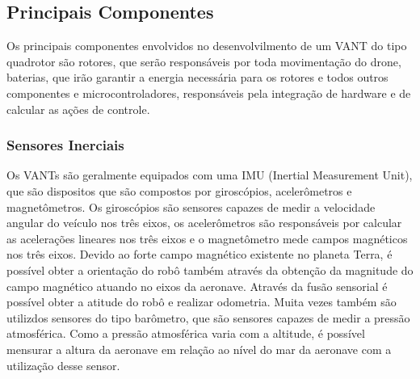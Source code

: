 
\subsection{Principais Componentes}

Os principais componentes envolvidos no desenvolvilmento de um VANT do tipo quadrotor são rotores, que serão responsáveis por toda movimentação do drone, baterias, que irão garantir a energia necessária para os rotores e todos outros componentes e microcontroladores, responsáveis pela integração de hardware e de calcular as ações de controle.

\subsubsection{Sensores Inerciais}

Os VANTs são geralmente equipados com uma IMU (Inertial Measurement Unit), que são dispositos que são compostos por giroscópios, acelerômetros e magnetômetros. Os giroscópios são sensores capazes de medir a velocidade angular do veículo nos três eixos, os acelerômetros são responsáveis por calcular as acelerações lineares nos três eixos e o magnetômetro mede campos magnéticos nos três eixos. Devido ao forte campo magnético existente no planeta Terra, é possível obter a orientação do robô também através da obtenção da magnitude do campo magnético atuando no eixos da aeronave. Através da fusão sensorial é possível obter a atitude do robô e realizar odometria. Muita vezes também são utilizdos sensores do tipo barômetro, que são sensores capazes de medir a pressão atmosférica. Como a pressão atmosférica varia com a altitude, é possível mensurar a altura da aeronave em relação ao nível do mar da aeronave com a utilização desse sensor.

